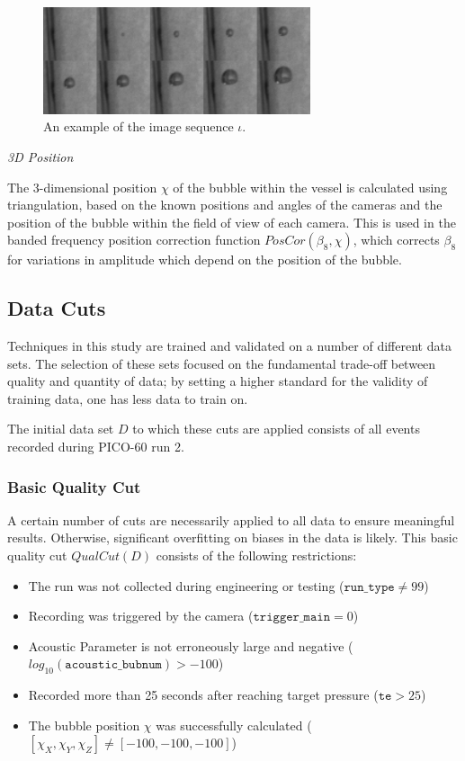 \documentclass[10pt]{article}
\begin{document}
\begin{figure}[h]
    \centering
    \includegraphics[width=0.7\textwidth]{image_grid}
    \caption{\label{} An example of the image sequence $\iota$.}
\end{figure}

\textit{3D Position}

The 3-dimensional position $\chi$ of the bubble within the vessel is calculated using triangulation, based on the known positions and angles of the cameras and the position of the bubble within the field of view of each camera. This is used in the banded frequency position correction function $PosCor(\beta _{8}, \chi)$, which corrects $\beta _{8}$ for variations in amplitude which depend on the position of the bubble.

\subsection{Data Cuts}

Techniques in this study are trained and validated on a number of different data sets. The selection of these sets focused on the fundamental trade-off between quality and quantity of data; by setting a higher standard for the validity of training data, one has less data to train on.

The initial data set $D$ to which these cuts are applied consists of all events recorded during PICO-60 run 2.

\subsubsection{Basic Quality Cut}

A certain number of cuts are necessarily applied to all data to ensure meaningful results. Otherwise, significant overfitting on biases in the data is likely. This basic quality cut $QualCut(D)$ consists of the following restrictions:

\begin{itemize}
    \item The run was not collected during engineering or testing ($\texttt{run\_type}\neq99$)
    \item Recording was triggered by the camera ($\texttt{trigger\_main}=0$)
    \item Acoustic Parameter is not erroneously large and negative ($log_{10}(\texttt{acoustic\_bubnum})>-100$)
    \item Recorded more than 25 seconds after reaching target pressure ($\texttt{te}>25$)
    \item The bubble position $\chi$ was successfully calculated ($[\chi_{X}, \chi_{Y}, \chi_{Z}]\neq[-100, -100, -100]$)
\end{itemize}
\end{document}
